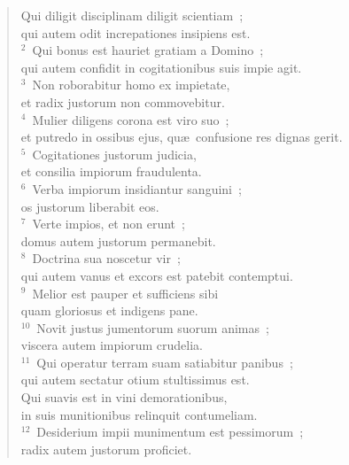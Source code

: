 \begin{flushleft}\begin{verse}\vspace{-19pt}\hspace{6pt}Qui diligit disciplinam diligit scientiam~;\\\hspace{6pt} qui autem odit increpationes insipiens est.\\
${}^{2}$~Qui bonus est hauriet gratiam a Domino~;\\ qui autem confidit in cogitationibus suis impie agit.\\
${}^{3}$~Non roborabitur homo ex impietate,\\ et radix justorum non commovebitur.\\
${}^{4}$~Mulier diligens corona est viro suo~;\\ et putredo in ossibus ejus, qu\ae\ confusione res dignas gerit.\\
${}^{5}$~Cogitationes justorum judicia,\\ et consilia impiorum fraudulenta.\\
${}^{6}$~Verba impiorum insidiantur sanguini~;\\ os justorum liberabit eos.\\
${}^{7}$~Verte impios, et non erunt~;\\ domus autem justorum permanebit.\\
${}^{8}$~Doctrina sua noscetur vir~;\\ qui autem vanus et excors est patebit contemptui.\\
${}^{9}$~Melior est pauper et sufficiens sibi\\ quam gloriosus et indigens pane.\\
${}^{10}$~Novit justus jumentorum suorum animas~;\\ viscera autem impiorum crudelia.\\
${}^{11}$~Qui operatur terram suam satiabitur panibus~;\\ qui autem sectatur otium stultissimus est.\\ Qui suavis est in vini demorationibus,\\ in suis munitionibus relinquit contumeliam.\\
${}^{12}$~Desiderium impii munimentum est pessimorum~;\\ radix autem justorum proficiet.\end{verse}\end{flushleft}


